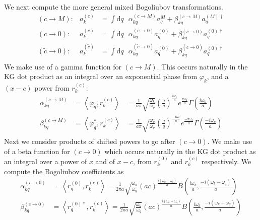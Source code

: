 \documentclass[12pt,a4paper]{article}
\newcommand{\dv}[1]{\mathrm{d} #1 \text{ }}
\begin{document}
We next compute the more general mixed Bogoliubov transformations.
\begin{equation}
  \begin{array}{rll}
  (c \rightarrow M) : & a^{(c)}_k &= \int \dv{q} \alpha^{(c \rightarrow M)}_{kq} a^{M}_q + \beta^{(c \rightarrow M)}_{kq} a^{(M)\dagger}_q \\
  (c \rightarrow 0) : &   a^{(c)}_k &= \int \dv{q} \alpha^{(c \rightarrow 0)}_{kq} a^{(0)}_q + \beta^{(c \rightarrow 0)}_{kq} a^{(0)\dagger}_q \\
  (\widetilde{c} \rightarrow 0) : &   a^{(\tilde{c})}_k &= \int \dv{q} \alpha^{(\widetilde{c} \rightarrow 0)}_{kq} a^{(0)}_q + \beta^{(\widetilde{c} \rightarrow 0)}_{kq} a^{(0)\dagger}_q \\
  \end{array}
\end{equation}
We make use of a gamma function for $(c \rightarrow M)$. This occurs naturally in the KG dot product as an integral over an exponential phase from $\varphi_k$, and a $(x-c)$ power from $r_k^{(c)}$:
\begin{equation}
  \begin{array}{ccl}
    \alpha^{(c \rightarrow M)}_{kq} &= \left<\varphi_q, r_k^{(c)} \right> &= \frac{1}{a \pi} \sqrt{\frac{\omega_k}{\omega_q}} \left(\frac{a}{q}\right)^{\frac{i\omega_k}{a}} e^{\frac{\pi \omega_k}{a}} \Gamma\left(\frac{i\omega_k}{a}\right) \\
    \beta^{(c \rightarrow M)}_{kq} &= \left<\varphi_q^*, r_k^{(c)} \right> &= \frac{1}{a \pi} \sqrt{\frac{\omega_k}{\omega_q}} \left(\frac{a}{q}\right)^{\frac{-i\omega_k}{a}} e^{\frac{-\pi \omega_k}{a}} \Gamma\left(\frac{-i\omega_k}{a}\right) \\
  \end{array}
  \label{bogo1}
\end{equation}
Next we consider products of shifted powers to go after $(c \rightarrow 0)$. We make use of a beta function for $(c \rightarrow 0)$ which occurs naturally in the KG dot product as an integral over a power of $x$ and of $x-c$, from $r_k^{(0)}$ and $r_k^{(c)}$ respectively.  We compute the Bogoliubov coefficients as
\begin{equation}
  \begin{aligned}
    \alpha^{(c \rightarrow 0)}_{kq} &= \left<r_q^{(0)}, r_k^{(c)} \right> = \frac{1}{2 \pi a}\sqrt{\frac{\omega_k}{\omega_q}} (ac)^{\frac{i(\omega_k - \omega_q)}{a}} B\left(\frac{i\omega_k}{a}, \frac{-i(\omega_k - \omega_q)}{a}\right) \\
    \beta^{(c \rightarrow 0)}_{kq} &= \left<r_q^{(0)*}, r_k^{(c)} \right> = \frac{1}{2 \pi a}\sqrt{\frac{\omega_k}{\omega_q}} (ac)^{\frac{i(\omega_k + \omega_q)}{a}} B\left(\frac{i\omega_k}{a}, \frac{-i(\omega_k + \omega_q)}{a}\right) \\
  \end{aligned}
  \label{bogo2}
\end{equation}
\end{document}
